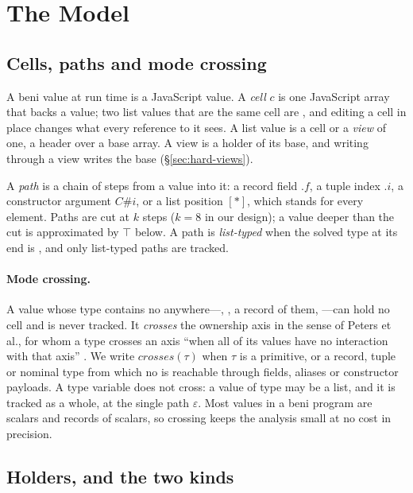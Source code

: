 \section{The Model}
\label{sec:model}

\subsection{Cells, paths and mode crossing}
\label{sec:model-cells}

A beni value at run time is a JavaScript value. A \emph{cell} $c$ is one JavaScript array that
backs a  value; two list values that are the same cell are \code{===}, and editing a cell
in place changes what every reference to it sees. A list value is a cell or a \emph{view} of one, a
header over a base array. A view is a holder of its base, and writing through a view writes the base
(\S\ref{sec:hard-views}).

A \emph{path} is a chain of steps from a value into it: a record field $.f$, a tuple index $.i$, a
constructor argument $C\#i$, or a list position $[\ast]$, which stands for every element. Paths are
cut at $k$ steps ($k = 8$ in our design); a value deeper than the cut is approximated by $\top$
below. A path is \emph{list-typed} when the solved type at its end is , and only
list-typed paths are tracked.

\paragraph{Mode crossing.} A value whose type contains no  anywhere---,
, a record of them, ---can hold no cell and is never tracked. It
\emph{crosses} the ownership axis in the sense of Peters et al., for whom a type crosses an axis
``when all of its values have no interaction with that axis'' \citep[\S2.3]{peters2026mode}. We write
$\mathit{crosses}(\tau)$ when $\tau$ is a primitive, or a record, tuple or nominal type from which no
 is reachable through fields, aliases or constructor payloads. A type variable does not
cross: a value of type  may be a list, and it is tracked as a whole, at the single path
$\varepsilon$. Most values in a beni program are scalars and records of scalars, so crossing keeps
the analysis small at no cost in precision.

\subsection{Holders, and the two kinds}
\label{sec:model-holders}

